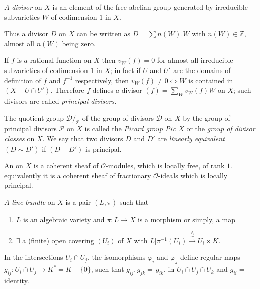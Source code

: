 {\setcounter{defn}{0}
\begin{defn}\label{chap1:sec2:def1} %
  $A$ {\em divisor} on $X$ is an element of the free abelian group
  generated by irreducible subvarieties $W$ of codimension $1$ in
  $X$. 
\end{defn}  

Thus a divisor $D$ on $X$ can be written as $D = \sum n(W).W$ with
$n(W) \in \mathbb{Z}$, almost all $n(W)$ being zero.  

If $f$ is $a$ rational function on $X$ then $v_{W}(f) = 0$ for almost
all irreducible subvarieties of codimension $1$ in $X$; in fact if $U$
and $U'$ are the domains of definition of $f$ and $f^{-1}$
respectively, then $v_{W}(f) \neq 0 \Longleftrightarrow W$ is
contained in $(X - U \cap U')$. Therefore $f$ defines $a$ divisor
$(f)=\sum\limits_{W} v_{W}(f)W$ on $X$; such divisors are called
\textit{principal divisors.} 

 The quotient group $\mathcal{D}/_{\mathcal{P}}$ of the group of
 divisors $\mathcal{D}$ on $X$ by the group of principal divisors
 $\mathcal{P}$ on $X$ is called the \textit{Picard group Pic $X$} or
 the \textit{group of divisor classes} on $X$. We say that two
 divisors $D$ and $D'$ are \textit{linearly equivalent} $(D \sim D')$
 if $(D - D')$ is principal.   
 
\begin{defn}\label{chap1:sec2:def2}%
  An on $X$ is a coherent sheaf of
  $\mathscr{O}$-modules, which is locally free, of rank
  $1$. equivalently it is a coherent sheaf of fractionary
  $\mathscr{O}$-ideals which is locally principal.    
\end{defn}  

\begin{defn}\label{chap1:sec2:def3}%
  $A$ {\em line bundle} on $X$ is a pair $(L, \pi)$ such that 
  \begin{enumerate}[\rm (i)]
  \item $L$ is an algebraic variety and $\pi : L \to X$ is a morphism
    or simply, a map 
  \item $\exists$ a (finite) open covering $(U_{i})$ of $X$ with $L
    \big|  \pi^{-1}(U_{i}) \xrightarrow{\overset{\varphi_{i}} \sim}
    U_{i} \times K$.  
  \end{enumerate}
\end{defn} 

In the intersections $U_{i} \cap U_{j}$, the isomorphisms
$\varphi_{i}$ and $\varphi_{j}$ define regular maps $g_{i j} :  U_{i}
\cap U_{j} \to K^{*} = K - \{0\}$, such that $g_{i j} .\, g_{j k} =\,
g_{i k}$, in $U_{i}\cap U_{j} \cap U_{k}$ and $g_{ii} = $ identity.  

}
